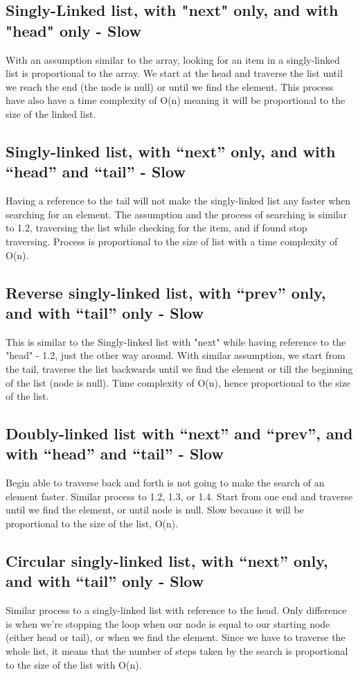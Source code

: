 \documentclass{article}
\begin{document}
\subsection{Singly-Linked list, with "next" only, and with "head" only - Slow}
\label{sec: hello}
With an assumption similar to the array, looking for an item in a singly-linked list is proportional to the array. We start at the head and traverse the list until we reach the end (the node is null) or until we find the element. This process have also have a time complexity of O(n) meaning it will be proportional to the size of the linked list.

\subsection{Singly-linked list, with “next” only, and with “head” and “tail” - Slow}
Having a reference to the tail will not make the singly-linked list any faster when searching for an element. The assumption and the process of searching is similar to 1.2, traversing the list while checking for the item, and if found stop traversing. Process is proportional to the size of list with a time complexity of O(n).

\subsection{Reverse singly-linked list, with “prev” only, and with “tail” only - Slow}
This is similar to the Singly-linked list with "next" while having reference to the "head" - 1.2, just the other way around. With similar assumption, we start from the tail, traverse the list backwards until we find the element or till the beginning of the list (node is null). Time complexity of O(n), hence proportional to the size of the list.

\subsection{Doubly-linked list with “next” and “prev”, and with “head” and “tail” - Slow}
Begin able to traverse back and forth is not going to make the search of an element faster. Similar process to 1.2, 1.3, or 1.4. Start from one end and traverse until we find the element, or until node is null. Slow because it will be proportional to the size of the list, O(n).


\subsection{Circular singly-linked list, with “next” only, and with “tail” only - Slow}
Similar process to a singly-linked list with reference to the head. Only difference is when we're stopping the loop when our node is equal to our starting node (either head or tail), or when we find the element. Since we have to traverse the whole list, it means that the number of steps taken by the search is proportional to the size of the list with O(n).
\end{document}
